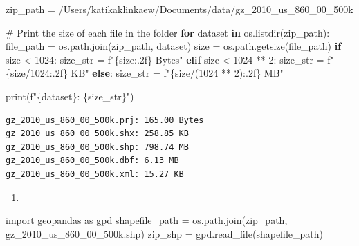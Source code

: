 \documentclass[
  letterpaper,
  DIV=11,
  numbers=noendperiod]{scrartcl}
\newenvironment{Shaded}{\begin{snugshade}}{\end{snugshade}}
\newcommand{\BuiltInTok}[1]{\textcolor[rgb]{0.00,0.23,0.31}{#1}}
\newcommand{\CommentTok}[1]{\textcolor[rgb]{0.37,0.37,0.37}{#1}}
\newcommand{\ControlFlowTok}[1]{\textcolor[rgb]{0.00,0.23,0.31}{\textbf{#1}}}
\newcommand{\DecValTok}[1]{\textcolor[rgb]{0.68,0.00,0.00}{#1}}
\newcommand{\ImportTok}[1]{\textcolor[rgb]{0.00,0.46,0.62}{#1}}
\newcommand{\KeywordTok}[1]{\textcolor[rgb]{0.00,0.23,0.31}{\textbf{#1}}}
\newcommand{\NormalTok}[1]{\textcolor[rgb]{0.00,0.23,0.31}{#1}}
\newcommand{\OperatorTok}[1]{\textcolor[rgb]{0.37,0.37,0.37}{#1}}
\newcommand{\SpecialCharTok}[1]{\textcolor[rgb]{0.37,0.37,0.37}{#1}}
\newcommand{\SpecialStringTok}[1]{\textcolor[rgb]{0.13,0.47,0.30}{#1}}
\newcommand{\StringTok}[1]{\textcolor[rgb]{0.13,0.47,0.30}{#1}}
\providecommand{\tightlist}{%
  \setlength{\itemsep}{0pt}\setlength{\parskip}{0pt}}\usepackage{longtable,booktabs,array}
\begin{document}
\begin{Shaded}
\begin{Highlighting}[]
\NormalTok{zip\_path }\OperatorTok{=} \StringTok{\textquotesingle{}/Users/katikaklinkaew/Documents/data/gz\_2010\_us\_860\_00\_500k\textquotesingle{}}

\CommentTok{\# Print the size of each file in the folder}
\ControlFlowTok{for}\NormalTok{ dataset }\KeywordTok{in}\NormalTok{ os.listdir(zip\_path):}
\NormalTok{    file\_path }\OperatorTok{=}\NormalTok{ os.path.join(zip\_path, dataset)}
\NormalTok{    size }\OperatorTok{=}\NormalTok{ os.path.getsize(file\_path)}
    \ControlFlowTok{if}\NormalTok{ size }\OperatorTok{\textless{}} \DecValTok{1024}\NormalTok{:}
\NormalTok{        size\_str }\OperatorTok{=} \SpecialStringTok{f"}\SpecialCharTok{\{}\NormalTok{size}\SpecialCharTok{:.2f\}}\SpecialStringTok{ Bytes"}
    \ControlFlowTok{elif}\NormalTok{ size }\OperatorTok{\textless{}} \DecValTok{1024} \OperatorTok{**} \DecValTok{2}\NormalTok{:}
\NormalTok{        size\_str }\OperatorTok{=} \SpecialStringTok{f"}\SpecialCharTok{\{}\NormalTok{size}\OperatorTok{/}\DecValTok{1024}\SpecialCharTok{:.2f\}}\SpecialStringTok{ KB"}
    \ControlFlowTok{else}\NormalTok{:}
\NormalTok{        size\_str }\OperatorTok{=} \SpecialStringTok{f"}\SpecialCharTok{\{}\NormalTok{size}\OperatorTok{/}\NormalTok{(}\DecValTok{1024} \OperatorTok{**} \DecValTok{2}\NormalTok{)}\SpecialCharTok{:.2f\}}\SpecialStringTok{ MB"}

    \BuiltInTok{print}\NormalTok{(}\SpecialStringTok{f"}\SpecialCharTok{\{}\NormalTok{dataset}\SpecialCharTok{\}}\SpecialStringTok{: }\SpecialCharTok{\{}\NormalTok{size\_str}\SpecialCharTok{\}}\SpecialStringTok{"}\NormalTok{)}
\end{Highlighting}
\end{Shaded}

\begin{verbatim}
gz_2010_us_860_00_500k.prj: 165.00 Bytes
gz_2010_us_860_00_500k.shx: 258.85 KB
gz_2010_us_860_00_500k.shp: 798.74 MB
gz_2010_us_860_00_500k.dbf: 6.13 MB
gz_2010_us_860_00_500k.xml: 15.27 KB
\end{verbatim}

\begin{enumerate}
\def\labelenumi{\arabic{enumi}.}
\setcounter{enumi}{1}
\tightlist
\item
\end{enumerate}

\begin{Shaded}
\begin{Highlighting}[]
\ImportTok{import}\NormalTok{ geopandas }\ImportTok{as}\NormalTok{ gpd}
\NormalTok{shapefile\_path }\OperatorTok{=}\NormalTok{ os.path.join(zip\_path, }\StringTok{\textquotesingle{}gz\_2010\_us\_860\_00\_500k.shp\textquotesingle{}}\NormalTok{)}
\NormalTok{zip\_shp }\OperatorTok{=}\NormalTok{ gpd.read\_file(shapefile\_path)}
\end{Highlighting}
\end{Shaded}
\end{document}
